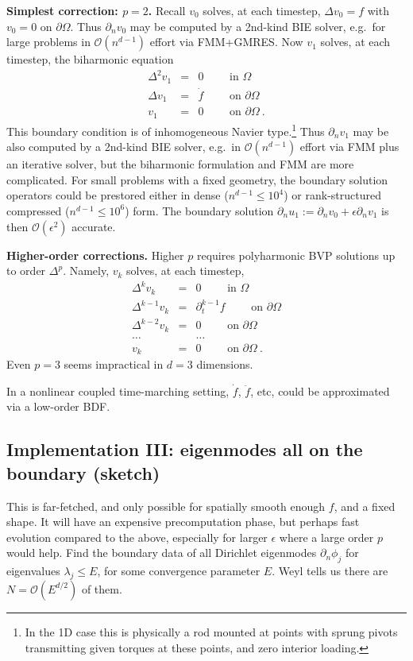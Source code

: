 \documentclass[10pt]{article}
\newcommand{\bea}{\begin{eqnarray}}
\newcommand{\eea}{\end{eqnarray}}
\newcommand{\bigO}{{\mathcal O}}
\newcommand{\pO}{{\partial\Omega}}
\newcommand{\eps}{\epsilon}
\newcommand{\dn}{\partial_n}
\newcommand{\dt}{\partial_t}
\begin{document}
{\bf Simplest correction: $p=2$.}
Recall $v_0$ solves, at each timestep, $\Delta v_0 = f$ with $v_0=0$ on $\pO$.
Thus $\dn v_0$ may be computed by a 2nd-kind BIE solver, e.g.\ for large problems in $\bigO(n^{d-1})$ effort via FMM+GMRES.
Now $v_1$ solves, at each timestep, the biharmonic equation
\bea
\Delta^2 v_1 &=& 0 \qquad \mbox{ in } \Omega
\\
\Delta v_1 &=& \dot f \qquad \mbox{ on } \pO
\\
v_1 &=& 0 \qquad \mbox{ on } \pO~.
\eea
This boundary condition is of inhomogeneous Navier type.\footnote{In the 1D case this is physically a rod mounted at points with sprung pivots transmitting given torques at these points, and zero interior loading.}
Thus $\dn v_1$ may be also computed by a 2nd-kind BIE solver, e.g.\ in $\bigO(n^{d-1})$ effort via FMM plus an iterative solver, but the biharmonic formulation and FMM are more complicated.
For small problems with a fixed geometry, the boundary solution operators
could be prestored either in dense ($n^{d-1} \le 10^4$)
or rank-structured compressed
($n^{d-1} \le 10^6$) form.
The boundary solution $\dn u_1 := \dn v_0 + \eps \dn v_1$ is then $\bigO(\eps^2)$
accurate.

{\bf Higher-order corrections.}
Higher $p$ requires polyharmonic BVP solutions up to order $\Delta^p$.
Namely, $v_k$ solves, at each timestep,
\bea
\Delta^k v_k &=& 0 \qquad \mbox{ in } \Omega
\\
\Delta^{k-1} v_k &=& \dt^{k-1} f \qquad \mbox{ on } \pO
\\
\Delta^{k-2} v_k &=& 0 \qquad \mbox{ on } \pO
\\
\dots &&\dots
\\
v_k &=& 0 \qquad \mbox{ on } \pO~.
\eea
Even $p=3$ seems impractical in $d=3$ dimensions.

In a nonlinear coupled time-marching setting,
$\dot f$, $\ddot f$, etc, could be approximated via a low-order
BDF.

\subsection{Implementation III: eigenmodes all on the boundary (sketch)}

This is far-fetched, and only possible for spatially smooth enough $f$,
and a fixed shape.
It will have an expensive precomputation phase,
but perhaps fast evolution compared to the above,
especially for larger $\eps$ where a large order $p$ would help.
Find the boundary data of all Dirichlet eigenmodes $\dn \phi_j$
for eigenvalues $\lambda_j \le E$, for some convergence parameter $E$.
Weyl tells us there are $N=\bigO(E^{d/2})$ of them.
\end{document}

